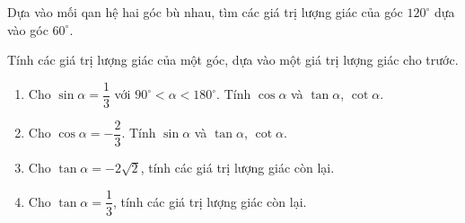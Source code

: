 \begin{vd}%
	Dựa vào mối qan hệ hai góc bù nhau, tìm các giá trị lượng giác của góc $120^\circ$ dựa vào góc $60^\circ$.
\end{vd}
\begin{vd}%
	Tính các giá trị lượng giác của một góc, dựa vào một giá trị lượng giác cho trước.
	\begin{enumerate}
		\item Cho $\sin\alpha=\dfrac{1}{3}$ với $90^\circ<\alpha<180^\circ$. Tính $\cos\alpha$ và $\tan\alpha$, $\cot \alpha$. 
		\item Cho $\cos\alpha=-\dfrac{2}{3}$. Tính $\sin\alpha$ và $\tan \alpha$, $\cot\alpha$.
		\item Cho $\tan\alpha=-2\sqrt{2}$, tính các giá trị lượng giác còn lại.
		\item Cho $\tan \alpha = \dfrac{1}{3}$, tính các giá trị lượng giác còn lại. 
	\end{enumerate}
\end{vd}
